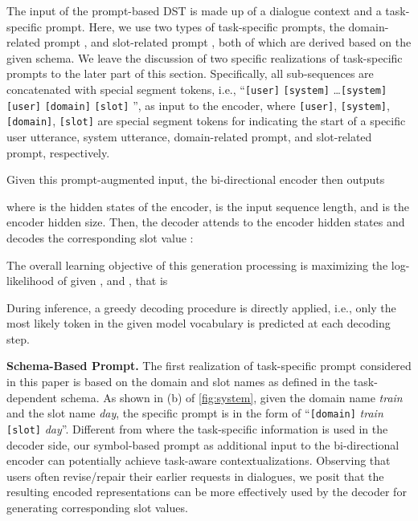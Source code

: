 \documentclass[11pt]{article}
\begin{document}
The input of the prompt-based DST is made up of a dialogue context  and a task-specific prompt.
Here, we use two types of task-specific prompts, the domain-related prompt , and slot-related prompt , both of which are derived based on the given schema. We leave the discussion of two specific realizations of task-specific prompts to the later part of this section.
Specifically, all sub-sequences are concatenated with special segment tokens, i.e.,
``\texttt{[user]}  \texttt{[system]}  \ldots \texttt{[system]}  \texttt{[user]}  \texttt{[domain]}  \texttt{[slot]} '',
as input to the encoder, where \texttt{[user]}, \texttt{[system]}, \texttt{[domain]}, \texttt{[slot]} are special segment tokens for indicating the start of a specific user utterance, system utterance, domain-related prompt, and slot-related prompt, respectively.

Given this prompt-augmented input, the bi-directional encoder then outputs

where  is the hidden states of the encoder,  is the input sequence length, and  is the encoder hidden size.
Then, the decoder attends to the encoder hidden states and decodes the corresponding slot value :

The overall learning objective of this generation processing is maximizing the log-likelihood of  given ,  and , that is

During inference, a greedy decoding procedure is directly applied, i.e., only the most likely token in the given model vocabulary is predicted at each decoding step.

\noindent
\textbf{Schema-Based Prompt.}
The first realization of task-specific prompt considered in this paper is based on the domain and slot names as defined in the task-dependent schema.
As shown in (b) of \autoref{fig:system}, given the domain name \textit{train} and the slot name \textit{day}, the specific prompt is in the form of
``\texttt{[domain]} \textit{train} \texttt{[slot]} \textit{day}''.
Different from \cite{lin-etal-2020-mintl,wu2019transferable} where the task-specific information is used in the decoder side, our symbol-based prompt as additional input to the bi-directional encoder can potentially achieve task-aware contextualizations.
Observing that users often revise/repair their earlier requests in dialogues, we posit that the resulting encoded representations can be more effectively used by the decoder for generating corresponding slot values.
\end{document}
